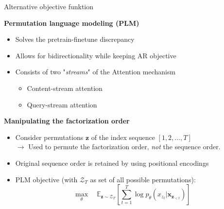 
\begin{frame}{Alternative objective funktion}

	\textbf{Permutation language modeling (PLM)}
	
	\begin{itemize}
		\item Solves the pretrain-finetune discrepancy
		\item Allows for bidirectionality while keeping AR objective
		\item Consists of two "\textit{streams}" of the Attention mechanism
				\begin{itemize}
					\item Content-stream attention
					\item Query-stream attention
				\end{itemize}
	\end{itemize}

	\vspace{.3cm}
	
	\textbf{Manipulating the factorization order}
	
	\begin{itemize}
		\item Consider permutations $\mathbf{z}$ of the index sequence $[1,2, \hdots, T]$\\
					$\rightarrow$ Used to permute the factorization order, \textit{not} the sequence order.
		\item Original sequence order is retained by using positional encodings
		\item PLM objective (with $\mathcal{Z}_T$ as set of all possible permutations):
					$$\max_{\theta} \quad \mathds{E}_{\mathbf{z}\sim\mathcal{Z}_T} \left[ \sum_{t=1}^{T} \log p_\theta (x_{z_t} | \mathbf{x}_{\mathbf{z}_{< t}}) \right]$$
	\end{itemize}
\end{frame}


